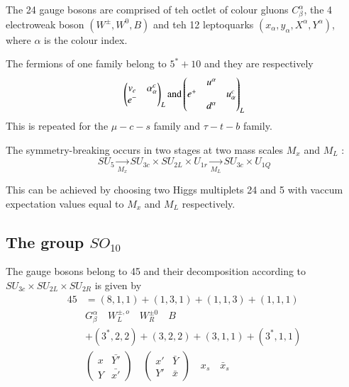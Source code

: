 The 24 gauge bosons are comprised of teh octlet of colour gluons $C^{\alpha}_{\beta}$, the 4 electroweak boson $(W^{\pm}, W^{0}, B)$ and teh 12 leptoquarks $(x_{\alpha}, y_{\alpha}, X^{\alpha}, Y^{\alpha})$, where $\alpha$ is the colour index.

The fermions of one family belong to $5^{*} + 10$ and they are respectively 
\begin{equation*}
\begin{pmatrix}
v_{e} & \alpha^{c}_{\alpha}\\
e^{-} &   
\end{pmatrix}_{L}
{\rm and}
\begin{pmatrix}
 & u^{\alpha}& \\
e^{+} &   & u^{c}_{\alpha}\\
      &d^{\alpha} &   
\end{pmatrix}_{L}
\end{equation*}
This is repeated for the $\mu -c -s$  family and $\tau-t-b$ family.

The symmetry-breaking occurs in two stages at two mass scales $M_{x}$ and $M_{L}$ :
$$
SU_{5}\xrightarrow[M_{x}]{} SU_{3c} \times SU_{2L} \times U_{1r} \xrightarrow[M_{L}]{} SU_{3c} \times U_{1Q}
$$

This can be achieved by choosing two Higgs multiplets 24 and 5 with vaccum expectation values equal to $M_{x}$ and $M_{L}$ respectively.

\subsection{The group $SO_{10}$}\label{subsec-3.2}

The gauge bosons belong to 45 and their decomposition according to $SU_{3c} \times SU_{2L} \times SU_{2R}$ is given by
\begin{align*}
45  &= (8,1,1) + (1,3,1) + (1,1,3) + (1,1,1)\\
     &G^{\alpha}_{\beta} \quad W^{\pm, o}_{L} \quad W^{\pm 0}_{R} \quad B\\
     &+ (3^{*}, 2,2) + (3,2,2) + (3,1,1) + (3^{*}, 1, 1)\\ 
     &\begin{pmatrix} x & \bar{Y'}\\ Y & \bar{x'}\end{pmatrix}\quad  \begin{pmatrix} x' & \bar{Y}\\ Y' & \bar{x}\end{pmatrix}\quad x_{s} \quad \bar{x}_{s}
\end{align*}


